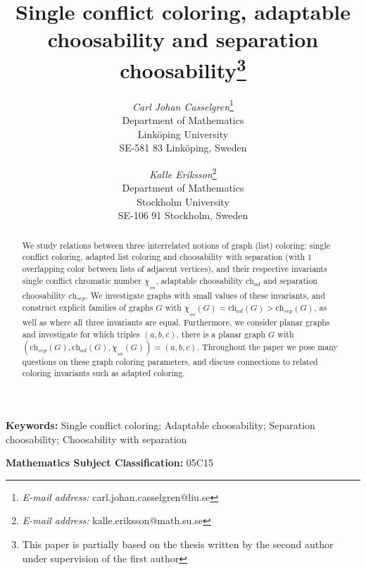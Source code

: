 \documentclass[12pt]{article}
\newcommand{\single}{\chi_{\nleftrightarrow}}
\newcommand{\ch}{\mathrm{ch}}
\begin{document}
\title{Single conflict coloring, adaptable choosability and separation 
choosability\footnote{This paper is partially based on the thesis written 
by the second author under supervision of the first author}}


\author{
{\sl Carl Johan Casselgren}\thanks{{\it E-mail address:} 
carl.johan.casselgren@liu.se}\\ 
Department of Mathematics \\
Link\"oping University \\ 
SE-581 83 Link\"oping, Sweden
\and
{\sl Kalle Eriksson}\thanks{{\it E-mail address:} 
kalle.eriksson@math.su.se}\\ 
Department of Mathematics \\
Stockholm University \\ 
SE-106 91 Stockholm, Sweden
}
%


\maketitle


\begin{abstract}
We study relations between three interrelated notions 
of graph (list) coloring:  single conflict coloring, adapted list coloring and choosability
with separation (with $1$ overlapping color between 
lists of adjacent vertices), and 
their respective invariants single conflict chromatic number $\single$, 
adaptable choosability $\ch_{ad}$ and separation 
choosability $\ch_{sep}$.
We 
investigate graphs with small values of these invariants,
and construct explicit families of graphs $G$ with
$\single(G) = \ch_{ad}(G) > \ch_{sep}(G)$, as well as where all three invariants are equal.
Furthermore, we consider planar graphs and investigate for which 
triples $(a,b,c)$, there is a planar graph $G$ with 
$(\ch_{sep}(G), \ch_{ad}(G), \single(G)) = (a,b,c)$.
Throughout the paper we pose many questions
on these graph coloring parameters, and discuss connections to related coloring 
invariants such as 
adapted coloring.
\end{abstract}

\noindent
{\bf Keywords:}  Single conflict coloring; Adaptable choosability; Separation choosability;
Choosability with separation  


\noindent
{\bf Mathematics Subject Classification:}  05C15
\end{document}
